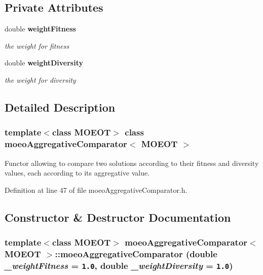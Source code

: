 \subsection*{Private Attributes}
\begin{CompactItemize}
\item 
double \bf{weight\-Fitness}\label{classmoeoAggregativeComparator_9ddf44b9e447bee8503c5b9cad9a7df0}

\begin{CompactList}\small\item\em the weight for fitness \item\end{CompactList}\item 
double \bf{weight\-Diversity}\label{classmoeoAggregativeComparator_d4ce25f797af0218c6c8cfca7c73b2d3}

\begin{CompactList}\small\item\em the weight for diversity \item\end{CompactList}\end{CompactItemize}


\subsection{Detailed Description}
\subsubsection*{template$<$class MOEOT$>$ class moeo\-Aggregative\-Comparator$<$ MOEOT $>$}

Functor allowing to compare two solutions according to their fitness and diversity values, each according to its aggregative value. 



Definition at line 47 of file moeo\-Aggregative\-Comparator.h.

\subsection{Constructor \& Destructor Documentation}
\subsubsection{\setlength{\rightskip}{0pt plus 5cm}template$<$class MOEOT$>$ \bf{moeo\-Aggregative\-Comparator}$<$ MOEOT $>$::\bf{moeo\-Aggregative\-Comparator} (double {\em \_\-weight\-Fitness} = {\tt 1.0}, double {\em \_\-weight\-Diversity} = {\tt 1.0})\hspace{0.3cm}{\tt  [inline]}}\label{classmoeoAggregativeComparator_76cc4d0f5f9bd4984c77410ad8142914}


